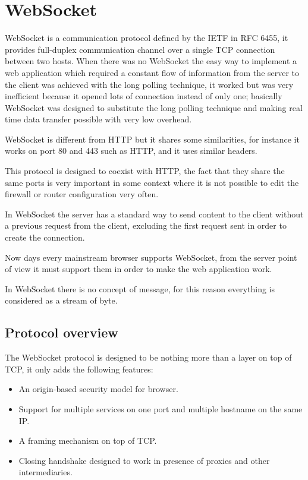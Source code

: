\section{WebSocket}
WebSocket is a communication protocol defined by the IETF in RFC 6455, it provides full-duplex communication channel over a single TCP connection between two hosts.\newline
When there was no WebSocket the easy way to implement a web application which required a constant flow of information from the server to the client was achieved with the long polling technique, it worked but was very inefficient because it opened lots of connection instead of only one; basically WebSocket was designed to substitute the long polling technique and making real time data transfer possible with very low overhead.\newline

WebSocket is different from HTTP but it shares some similarities, for instance it works on port 80 and 443 such as HTTP, and it uses similar headers.\newline

This protocol is designed to coexist with HTTP, the fact that they share the same ports is very important in some context where it is not possible to edit the firewall or router configuration very often.\newline

In WebSocket the server has a standard way to send content to the client without a previous request from the client, excluding the first request sent in order to create the connection.\newline

Now days every mainstream browser supports WebSocket, from the server point of view it must support them in order to make the web application work.\newline

In WebSocket there is no concept of message, for this reason everything is considered as a stream of byte.\newline

\subsection{Protocol overview}
The WebSocket protocol is designed to be nothing more than a layer on top of TCP, it only adds the following features:
\begin{itemize}
	\item An origin-based security model for browser.
	\item Support for multiple services on one port and multiple hostname on the same IP.
	\item A framing mechanism on top of TCP.
	\item Closing handshake designed to work in presence of proxies and other intermediaries.
\end{itemize}

